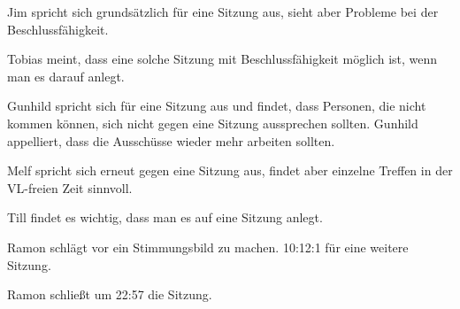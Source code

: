 \documentclass[ngerman,headheight=70pt]{scrartcl}
\begin{document}
    Jim spricht sich grundsätzlich für eine Sitzung aus, sieht aber Probleme
    bei der Beschlussfähigkeit.

    Tobias meint, dass eine solche Sitzung mit Beschlussfähigkeit möglich ist,
    wenn man es darauf anlegt.

    Gunhild spricht sich für eine Sitzung aus und findet, dass Personen, die nicht
    kommen können, sich nicht gegen eine Sitzung aussprechen sollten.
    Gunhild appelliert, dass die Ausschüsse wieder mehr arbeiten sollten.

    Melf spricht sich erneut gegen eine Sitzung aus, findet aber einzelne
    Treffen in der VL-freien Zeit sinnvoll.

    Till findet es wichtig, dass man es auf eine Sitzung anlegt.

    Ramon schlägt vor ein Stimmungsbild zu machen. 10:12:1 für eine weitere Sitzung.

    Ramon schließt um 22:57 die Sitzung.
\end{document}
